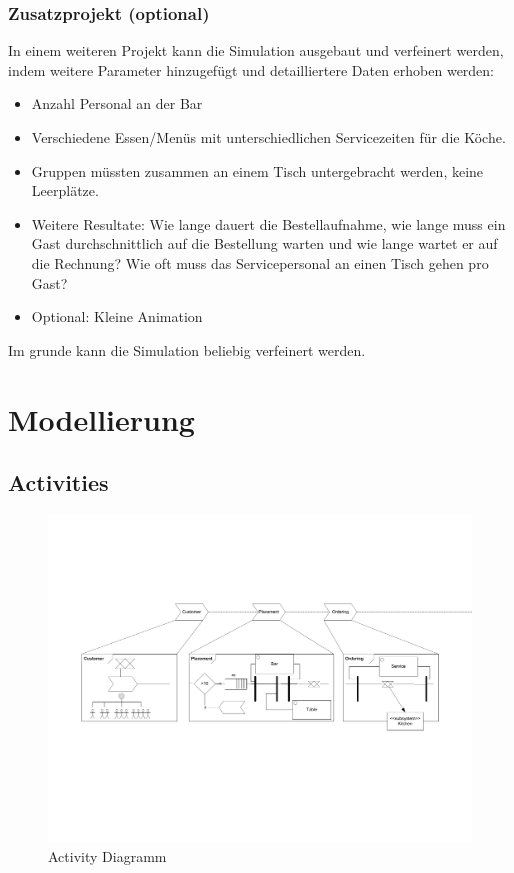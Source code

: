 \documentclass[ngerman,a4paper,12pt]{scrreprt}
\begin{document}
\subsection{Zusatzprojekt (optional)}
	In einem weiteren Projekt kann die Simulation ausgebaut und verfeinert werden, indem weitere Parameter hinzugefügt  und detailliertere Daten erhoben werden:
	\begin{itemize}
		\item Anzahl Personal an der Bar
		\item Verschiedene Essen/Menüs mit unterschiedlichen Servicezeiten für die Köche.
		\item Gruppen müssten zusammen an einem Tisch untergebracht werden, keine Leerplätze.
		\item Weitere Resultate: Wie lange dauert die Bestellaufnahme, wie lange muss ein Gast durchschnittlich auf die Bestellung warten und wie lange wartet er auf die Rechnung? Wie oft muss das Servicepersonal an einen Tisch gehen pro Gast?
		\item Optional: Kleine Animation
	\end{itemize}
	
	Im grunde kann die Simulation beliebig verfeinert werden.


\chapter{Modellierung}
	\section{Activities}
		\begin{figure}[H]
			\centering
				\includegraphics[page=4,trim=1cm 3cm 2.5cm 1cm, clip=true,width=\textwidth]{../model/Modell_v2.pdf}
				\caption[Activity Diagramm]{Activity Diagramm}
				\label{activityDiagramm}
		\end{figure}
		
\end{document}
